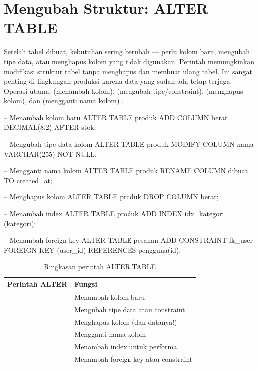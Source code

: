 \section{Mengubah Struktur: ALTER TABLE}

Setelah tabel dibuat, kebutuhan sering berubah --- perlu kolom baru, mengubah tipe data, atau menghapus kolom yang tidak digunakan. Perintah  memungkinkan modifikasi struktur tabel tanpa menghapus dan membuat ulang tabel. Ini sangat penting di lingkungan produksi karena data yang sudah ada tetap terjaga. Operasi utama:  (menambah kolom),  (mengubah tipe/constraint),  (menghapus kolom), dan  (mengganti nama kolom) \cite{mysqlDocs}.

\begin{webcode}[language=SQL, caption={Contoh penggunaan ALTER TABLE}]
-- Menambah kolom baru
ALTER TABLE produk ADD COLUMN berat DECIMAL(8,2) AFTER stok;

-- Mengubah tipe data kolom
ALTER TABLE produk MODIFY COLUMN nama VARCHAR(255) NOT NULL;

-- Mengganti nama kolom
ALTER TABLE produk RENAME COLUMN dibuat TO created_at;

-- Menghapus kolom
ALTER TABLE produk DROP COLUMN berat;

-- Menambah index
ALTER TABLE produk ADD INDEX idx_kategori (kategori);

-- Menambah foreign key
ALTER TABLE pesanan ADD CONSTRAINT fk_user
  FOREIGN KEY (user_id) REFERENCES pengguna(id);
\end{webcode}

\begin{table}[ht]
\centering
\begin{tabular}{|P{4cm}|P{8.5cm}|}
\hline
\textbf{Perintah ALTER} & \textbf{Fungsi} \\
\hline
{} & Menambah kolom baru \\
\hline
{} & Mengubah tipe data atau constraint \\
\hline
{} & Menghapus kolom (dan datanya!) \\
\hline
{} & Mengganti nama kolom \\
\hline
{} & Menambah index untuk performa \\
\hline
{} & Menambah foreign key atau constraint \\
\hline
\end{tabular}
\caption{Ringkasan perintah ALTER TABLE}
\end{table}


